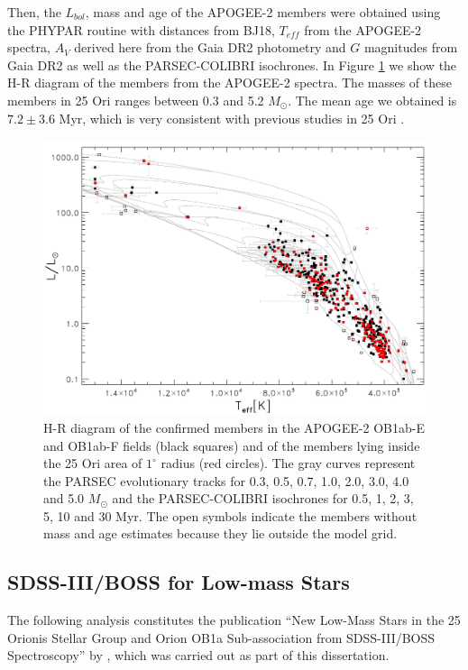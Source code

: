 \documentclass[12pt]{article}
\begin{document}
Then, the $L_{bol}$, mass and age of the APOGEE-2 members were obtained using the PHYPAR routine with distances from BJ18, $T_{eff}$ from the APOGEE-2 spectra, $A_V$ derived here from the Gaia DR2 photometry and $G$ magnitudes from Gaia DR2 as well as the PARSEC-COLIBRI isochrones. In Figure \ref{fig_APOGEE-2:HR} we show the H-R diagram of the members from the APOGEE-2 spectra. The masses of these members in 25 Ori ranges between 0.3 and 5.2 $M_\odot$. The mean age we obtained is $7.2\pm3.6$ Myr, which is very consistent with previous studies in 25 Ori \citep[][ and references therein]{Briceno2018}.

\begin{figure}[ht!]
	\centering
	\includegraphics[width=1.\textwidth]{HR_APOGEE-2.pdf}
	\caption[H-R diagram of the 25 Ori confirmed members from APOGEE-2 spectra.]{H-R diagram of the confirmed members in the APOGEE-2 OB1ab-E and OB1ab-F fields (black squares) and of the members lying inside the 25 Ori area of $1^\circ$ radius (red circles). The gray curves represent the PARSEC evolutionary tracks for 0.3, 0.5, 0.7, 1.0, 2.0, 3.0, 4.0 and 5.0 $M_\odot$ and the PARSEC-COLIBRI isochrones for 0.5, 1, 2, 3, 5, 10 and 30 Myr. The open symbols indicate the members without mass and age estimates because they lie outside the model grid.}
	\label{fig_APOGEE-2:HR}
\end{figure}

\subsection[SDSS-III/BOSS for Low-mass Stars]{SDSS-III/BOSS for Low-mass Stars \citep{Suarez2017}}
\label{sec:BOSS}
The following analysis constitutes the publication ``New Low-Mass Stars in the 25 Orionis Stellar Group and Orion OB1a Sub-association from SDSS-III/BOSS Spectroscopy'' by \citet{Suarez2017}, which was carried out as part of this dissertation.
\end{document}

